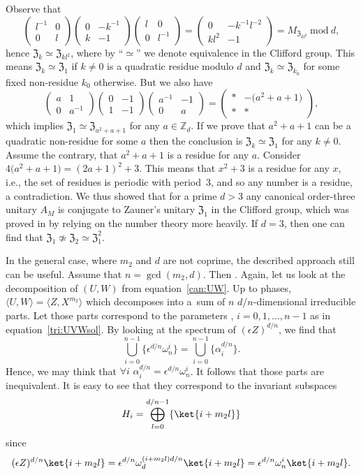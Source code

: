 \documentclass[pdftex]{sigma}
\numberwithin{equation}{section}
\newcommand{\ea}[1]{\begin{align}#1\end{align}}
\newcommand{\la}{\langle}
\newcommand{\ra}{\rangle}
\newcommand{\mmod}{\mathrm{~mod~}}
\newcommand{\mbb}{\mathbb}
\newcommand{\bmp}{\begin{pmatrix}}
\newcommand{\emp}{\end{pmatrix}}
\begin{document}
Observe that
\[
\bmp l^{-1} & 0 \\ 0 & l \emp
\bmp 0 & -k^{-1} \\ k & -1 \emp
\bmp l & 0 \\ 0 & l^{-1} \emp
=
\bmp 0 & -k^{-1}l^{-2} \\ kl^{2} & -1 \emp
= M_{\mathfrak{Z}_{kl^2}} \mmod d,
\]
hence $\mathfrak{Z}_{k} \simeq \mathfrak{Z}_{kl^2}$, where by ``$\simeq$'' we denote equivalence in the Clifford group.
This means $\mathfrak{Z}_{k} \simeq \mathfrak{Z}_{1}$ if $k\neq0$ is a quadratic residue modulo $d$
and $\mathfrak{Z}_{k} \simeq \mathfrak{Z}_{k_0}$ for some fixed non-residue $k_0$ otherwise.
But we also have
\[
\bmp a & 1 \\ 0 & a^{-1} \emp
\bmp 0 & -1 \\ 1 & -1 \emp
\bmp a^{-1} & -1 \\ 0 & a \emp
=
\bmp * & -\bigl(a^2+a+1\bigr) \\ * & * \emp,
\]
which implies $\mathfrak{Z}_1 \simeq \mathfrak{Z}_{a^2+a+1}$ for any $a\in\mbb{Z}_d$.
If we prove that $a^2+a+1$ can be a quadratic non-residue for some $a$ then
the conclusion is $\mathfrak{Z}_k \simeq \mathfrak{Z}_1$ for any $k\neq0$.
Assume the contrary, that $a^2+a+1$ is a residue for any $a$.
Consider $4\bigl(a^2+a+1\bigr) = (2a+1)^2+3$. This means that $x^2+3$ is a residue for any $x$,
i.e., the set of residues is periodic with period~3, and so any number is a residue,
a contradiction.
We thus showed that for a prime $d > 3$ any canonical order-three unitary $A_M$ is conjugate
to Zauner's unitary $\mathfrak{Z}_1$ in the Clifford group, which was proved in \cite{Fla} by relying
on the number theory more heavily.
If $d=3$, then one can find that $\mathfrak{Z}_1 \not\simeq \mathfrak{Z}_2 \simeq \mathfrak{Z}_1^2$.

In the general case, where $m_2$ and $d$ are not coprime, the described approach still can be useful.
Assume that $n = \gcd(m_2, d)$.
Then .
Again, let us look at the decomposition of $(U,W)$ from equation~\eqref{can:UW}.
Up to phases, $\la U, W \ra = \la Z, X^{m_2} \ra$ which decomposes into a~sum
of $n$ $d/n$-dimensional irreducible parts.
Let those parts correspond to the parameters
,
$i=0,1,\dots,n-1$ as in equation~\eqref{tri:UVWsol}.
By looking at the spectrum of $(\epsilon Z)^{d/n}$, we find that
\[
 \bigcup_{i=0}^{n-1} \bigl\{\epsilon^{d/n} \omega_n^i \bigr\}
 = \bigcup_{i=0}^{n-1} \bigl\{\alpha_i^{d/n}\bigr\}.
\]
Hence, we may think that $\forall i$ $\alpha_i^{d/n} = \epsilon^{d/n} \omega_n^i$.
It follows that those parts are inequivalent.
It is easy to see that they correspond to the invariant subspaces
\ea{\label{can:H}
 H_i = \bigoplus_{l=0}^{d/n-1} \{\ket{i+m_2 l}\}
}
since
\[
 (\epsilon Z)^{d/n}\ket{i+m_2 l}
 = \epsilon^{d/n}\omega_d^{(i+m_2 l)d/n}\ket{i+m_2 l}
 = \epsilon^{d/n}\omega_n^{i}\ket{i+m_2 l}.
\]
\end{document}
